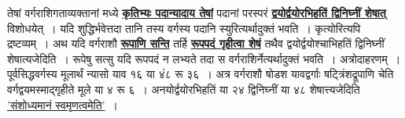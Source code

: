 \documentclass[11pt, openany]{book}
\begin{document}
\begin{sloppypar}
तेषां वर्गराशिगताव्यक्तानां मध्ये \hyperref[3.31]{\textbf{कृतिभ्यः पदान्यादाय तेषां}} पदानां परस्परं \hyperref[3.31]{\textbf{द्वयोर्द्वयोरभिहतिं द्विनिघ्नीं शेषात्}} विशोधयेत्~। यदि शुद्धिर्भवेत्तदा तानि तस्य वर्गस्य पदानि स्युरित्यर्थादुक्तं भवति~। कृत्योरित्यपि द्रष्टव्यम्~। अथ यदि वर्गराशौ \hyperref[3.31]{\textbf{रूपाणि सन्ति}} तर्हि \hyperref[3.31]{\textbf{रूपपदं गृहीत्वा शेषं}} तथैव द्वयोर्द्वयोश्चाभिहतिं द्विनिघ्नीं शेषात्यजेदिति~। रूपेषु सत्सु यदि रूपपदं न लभ्यते तदा स वर्गराशिर्नेत्यर्थादुक्तं भवति~। अत्रोदाहरणम्~। पूर्वसिद्धवर्गस्य मूलार्थं न्यासो याव १६ या ४ं८ रू ३६~। अत्र वर्गराशौ षोडश यावद्वर्गाः षट्त्रिंशद्रूपाणि चेति वर्गद्वयमस्माद्गृहीते मूले या ४ रू ६~। अनयोर्द्वयोरभिहतिं या २४ द्विनिघ्नीं या ४८ शेषात्त्यजेदिति \hyperref[1.7]{'संशोध्यमानं स्वमृणत्वमेति'}~।
\end{sloppypar}

\newpage
\end{document}
